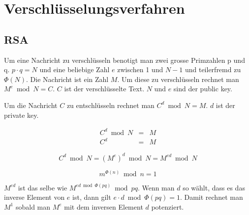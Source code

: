 \section{Verschlüsselungsverfahren}
\subsection{RSA}

Um eine Nachricht zu verschlüsseln benotigt man zwei grosse Primzahlen p und q. $p \cdot q = N$ und eine beliebige Zahl $e$ zwischen 1 und $N-1$ und teilerfremd zu $\Phi(N)$. Die Nachricht ist ein Zahl $M$. Um diese zu verschlüsseln rechnet man $M^e \bmod N = C$. $C$ ist der verschlüsselte Text. $N$ und $e$ sind der public key. 

Um die Nachricht $C$ zu entschlüsseln rechnet man $C^d \bmod N = M$. $d$ ist der private key.

\begin{eqnarray}
C^d \bmod N & = & M \\
C^d & = & M
\end{eqnarray}

\begin{equation*}
C^d \bmod N  =  (M^e)^d \bmod N = M^{ed} \bmod N
\end{equation*}

\begin{satz}
\begin{equation*}
m^{\Phi (n)} \bmod n = 1
\end{equation*}
\end{satz}

 $M^{ed}$  ist das selbe wie $M^{ed \bmod \Phi (pq)} \bmod pq$. Wenn man $d$ so wählt, dass es das inverse Element von $e$ ist, dann gilt $e \cdot d \bmod \Phi(pq) = 1$. Damit rechnet man $M^1$ sobald man $M^e$ mit dem inversen Element $d$ potenziert.

